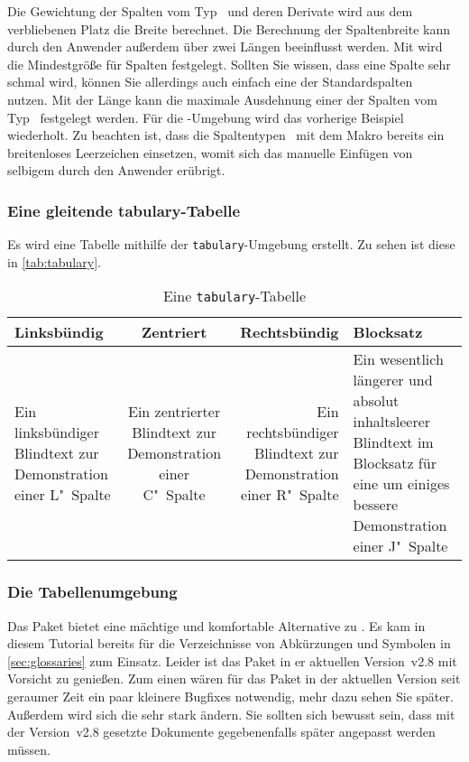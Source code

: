 \documentclass[%
  english,ngerman,%
  cdgeometry=no,DIV=12,automark,%
]{tudscrartcl}
\begin{document}
Die Gewichtung der Spalten vom Typ~ und deren Derivate wird aus 
dem verbliebenen Platz die Breite berechnet. Die Berechnung der Spaltenbreite 
kann durch den Anwender außerdem über zwei Längen beeinflusst werden. Mit 
 wird die Mindestgröße für Spalten festgelegt. Sollten Sie 
wissen, dass eine Spalte sehr schmal wird, können Sie allerdings auch einfach 
eine der Standardspalten~ nutzen. Mit der Länge  
kann die maximale Ausdehnung einer der Spalten vom Typ~ festgelegt 
werden. Für die -Umgebung wird das vorherige Beispiel 
wiederholt. Zu beachten ist, dass die Spaltentypen~ mit dem Makro 
 bereits ein breitenloses Leerzeichen einsetzen, womit sich das 
manuelle Einfügen von selbigem durch den Anwender erübrigt.
%
\begin{Trunk+}
\subsubsection{Eine gleitende tabulary-Tabelle}
Es wird eine Tabelle mithilfe der \texttt{tabulary}-Umgebung erstellt. 
Zu sehen ist diese in \autoref{tab:tabulary}. 

\end{Trunk+}
\begin{Trunk}
\begin{table}
\begin{tabulary}{\textwidth}{@{}LCRJ@{}}
\toprule
\textbf{Linksbündig} & \textbf{Zentriert} & 
\textbf{Rechtsbündig} & \textbf{Blocksatz} \tabularnewline
\midrule
Ein linksbündiger Blindtext zur Demonstration einer L"~Spalte &
Ein zentrierter Blindtext zur Demonstration einer C"~Spalte &
Ein rechtsbündiger Blindtext zur Demonstration einer R"~Spalte &
Ein wesentlich längerer und absolut inhaltsleerer Blindtext im 
Blocksatz für eine um einiges bessere Demonstration einer J"~Spalte
\tabularnewline
\bottomrule
\end{tabulary}
\caption{Eine \texttt{tabulary}-Tabelle}\label{tab:tabulary}
\end{table}

\end{Trunk}
\InputCode


\subsubsection{Die Tabellenumgebung }
\label{sec:tabu}
Das Paket  bietet eine mächtige und komfortable Alternative zu 
. Es kam in diesem Tutorial bereits für die Verzeichnisse von 
Abkürzungen und Symbolen in \autoref{sec:glossaries} zum Einsatz. Leider ist 
das Paket in er aktuellen Version~v2.8 mit Vorsicht zu genießen. Zum einen
wären für das Paket in der aktuellen Version seit geraumer Zeit ein paar 
kleinere Bugfixes notwendig, mehr dazu sehen Sie später. Außerdem wird sich die 
 sehr stark ändern. Sie sollten sich bewusst sein, dass mit der Version~v2.8
gesetzte Dokumente gegebenenfalls später angepasst werden müssen.
\end{document}
